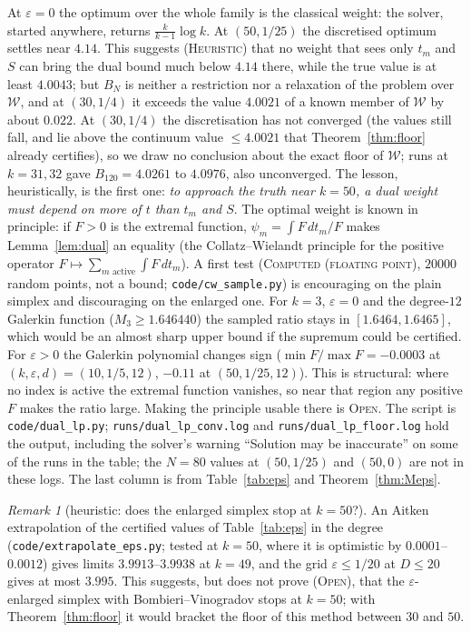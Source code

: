 \documentclass[11pt]{amsart}
\theoremstyle{definition}
\theoremstyle{remark}
\newtheorem{remark}[theorem]{Remark}
\newcommand{\lbl}[1]{\textup{\textsc{#1}}}
\begin{document}
At $\varepsilon=0$ the optimum over the whole family is the classical weight:
the solver, started anywhere, returns $\frac{k}{k-1}\log k$. At
$(50,1/25)$ the discretised optimum settles near $4.14$. This suggests
(\lbl{Heuristic}) that no weight that sees only $t_m$ and $S$ can bring the
dual bound much below $4.14$ there, while the true value is at least $4.0043$;
but $B_N$ is neither a restriction nor a relaxation of the problem over
$\mathcal W$, and at $(30,1/4)$ it exceeds the value $4.0021$ of a known
member of $\mathcal W$ by about $0.022$. At $(30,1/4)$ the discretisation has not
converged (the values still fall, and lie above the continuum value $\le4.0021$
that Theorem~\ref{thm:floor} already certifies), so we draw no conclusion about
the exact floor of $\mathcal W$; runs at $k=31,32$ gave $B_{120}=4.0261$ to
$4.0976$, also unconverged. The lesson, heuristically, is the first one:
\emph{to approach the truth near $k=50$, a dual weight must depend on more of
$t$ than $t_m$ and $S$}. The optimal weight is known in principle: if $F>0$ is the extremal
function, $\psi_m=\int F\,dt_m/F$ makes Lemma~\ref{lem:dual} an equality (the
Collatz--Wielandt principle for the positive operator
$F\mapsto\sum_{m\text{ active}}\int F\,dt_m$). A first test
(\lbl{Computed (floating point)}, $20000$ random points, not a bound;
\texttt{code/cw\_sample.py}) is encouraging on the plain simplex and
discouraging on the enlarged one. For $k=3$, $\varepsilon=0$ and the
degree-$12$ Galerkin function ($M_3\ge1.646440$) the sampled ratio stays in
$[1.6464,1.6465]$, which would be an almost sharp upper bound if the supremum
could be certified. For $\varepsilon>0$ the Galerkin polynomial changes sign
($\min F/\max F=-0.0003$ at $(k,\varepsilon,d)=(10,1/5,12)$, $-0.11$ at
$(50,1/25,12)$). This is structural: where no index is active the extremal
function vanishes, so near that region any positive $F$ makes the ratio
large. Making the principle usable there is \lbl{Open}. The script is \texttt{code/dual\_lp.py};
\texttt{runs/dual\_lp\_conv.log} and \texttt{runs/dual\_lp\_floor.log} hold the
output, including the solver's warning ``Solution may be inaccurate'' on some
of the runs in the table; the $N=80$ values at $(50,1/25)$ and $(50,0)$ are
not in these logs. The last column is from Table~\ref{tab:eps} and
Theorem~\ref{thm:Meps}.

\begin{remark}[heuristic: does the enlarged simplex stop at $k=50$?]\label{rem:k49}
An Aitken extrapolation of the certified values of Table~\ref{tab:eps} in the
degree (\texttt{code/extrapolate\_eps.py}; tested at $k=50$, where it is
optimistic by $0.0001$--$0.0012$) gives limits $3.9913$--$3.9938$ at $k=49$, and
the grid $\varepsilon\le1/20$ at $D\le20$ gives at most $3.995$. This suggests,
but does not prove (\lbl{Open}), that the $\varepsilon$-enlarged simplex with
Bombieri--Vinogradov stops at $k=50$; with Theorem~\ref{thm:floor} it would
bracket the floor of this method between $30$ and $50$.
\end{remark}
\end{document}

